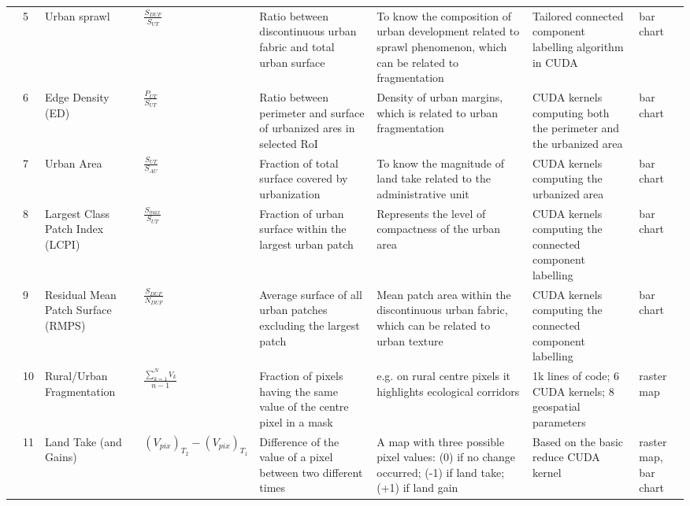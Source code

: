 \documentclass[APA,LATO1COL,doublespace]{WileyNJD-v2}
\begin{document}
\begin{table}[b]
\begin{tabular}{m{0.3cm} p{0.1cm} p{1.2cm} p{3.5cm} *{3}{p{2.7cm}} p{1.0cm} }
    \midrule
    
    & 5 & Urban sprawl & 
    $\frac{S_{DUF}}{S_{UT}}$ 
    & Ratio between discontinuous urban fabric and total urban surface & To know the composition of urban development related to sprawl phenomenon, which can be related to fragmentation & Tailored connected component labelling algorithm in CUDA & bar chart \\
    
    & 6 & Edge Density (ED) &
    $\frac{P_{UT}}{S_{UT}}$ 
    & Ratio between perimeter and surface of urbanized ares in selected RoI & Density of urban margins, which is related to urban fragmentation & CUDA kernels computing both the perimeter and the urbanized area & bar chart \\
    
    & 7 & Urban Area &
    $\frac{S_{UT}}{S_{AU}}$ 
    & Fraction of total surface covered by urbanization & To know the magnitude of land take related to the administrative unit & CUDA kernels computing the urbanized area	& bar chart \\
    
    & 8	& Largest Class Patch Index (LCPI) & 
    $\frac{S_{max}}{S_{UT}}$ 
    & Fraction of urban surface within the largest urban patch & Represents the level of compactness of the urban area & CUDA kernels computing the connected component labelling	& bar chart \\
    
    & 9	& Residual Mean Patch Surface (RMPS) &
    $\frac{S_{DUF}}{N_{DUF}}$ 
    & Average surface of all urban patches excluding the largest patch & Mean patch area within the discontinuous urban fabric, which can be related to urban texture & CUDA kernels computing the connected component labelling & bar chart \\
    
    & 10 & Rural/Urban Fragmentation &
    $\frac{\sum^{N}_{k=1} V_k}{ n-1 }$ 
    & Fraction of pixels having the same value of the centre pixel in a mask & e.g. on rural centre pixels it highlights ecological corridors & 1k lines of code; 6 CUDA kernels; 8 geospatial parameters & raster map \\
    
    & 11 & Land Take (and Gains) &
    $ \left( V_{pix} \right)_{T_2} - \left( V_{pix} \right)_{T_1}$ 
    & Difference of the value of a pixel between two different times & A map with three possible pixel values: (0) if no change occurred; (-1) if land take; (+1) if land gain & Based on the basic reduce CUDA kernel & raster map, bar chart \\
    

\end{tabular}
\end{table}
\end{document}
